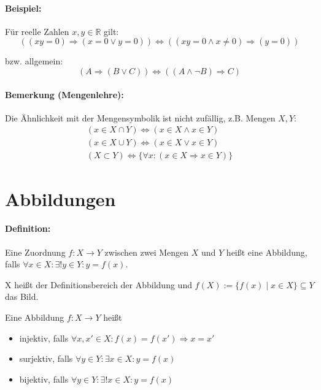 \paragraph{Beispiel:}
	Für reelle Zahlen $x,y\in\mathbb{R}$ gilt:
	\begin{equation*}
		\left((xy = 0)\Rightarrow (x=0 \lor y=0)\right) \Leftrightarrow \left((xy=0 \land x \neq 0)\Rightarrow (y =0)\right)
	\end{equation*}
	
	bzw. allgemein:
	\begin{equation*}
		(A\Rightarrow (B\lor C))\Leftrightarrow ((A\land\lnot B)\Rightarrow C)
	\end{equation*}

\paragraph{Bemerkung (Mengenlehre):}
	Die Ähnlichkeit mit der Mengensymbolik ist nicht zufällig, z.B. Mengen $X, Y$:
	\begin{gather*}
		(x\in X\cap Y)\Leftrightarrow (x\in X\land x\in Y)\\
		(x\in X\cup Y)\Leftrightarrow (x\in X\lor x\in Y)\\
		(X\subset Y) \Leftrightarrow \{\forall x : (x\in X \Rightarrow x\in Y)\}
	\end{gather*}

\section{Abbildungen}
\paragraph{Definition:}
	Eine Zuordnung $f: X\to Y$ zwischen zwei Mengen $X$ und $Y$ heißt eine Abbildung, falls $\forall x\in X: \exists ! y\in Y: y=f(x)$.

	X heißt der Definitionsbereich der Abbildung und $f(X):=\{f(x)\mid x\in X \}\subseteq Y$ das Bild.

	Eine Abbildung $f: X\to Y$ heißt
	\begin{itemize}
		\item injektiv, falls $\forall x,x'\in X:f(x) = f(x') \Rightarrow x=x'$
		\item surjektiv, falls $\forall y\in Y:\exists x\in X: y = f(x)$
		\item bijektiv, falls $\forall y\in Y:\exists !x\in X: y = f(x)$
	\end{itemize}

